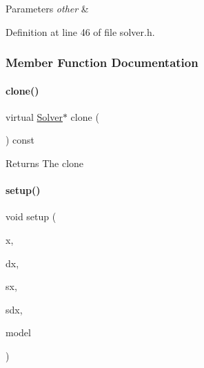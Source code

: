 \begin{DoxyParams}{Parameters}
{\em other} & \\
\hline
\end{DoxyParams}


Definition at line 46 of file solver.\+h.



\subsubsection{Member Function Documentation}
\mbox{\label{classamici_1_1_solver_ad40c0e06f5ee35afc1dd60e9f80ac5be}} 
\paragraph{\texorpdfstring{clone()}{clone()}}
{\footnotesize\ttfamily virtual \mbox{\hyperlink{classamici_1_1_solver}{Solver}}$\ast$ clone (\begin{DoxyParamCaption}{ }\end{DoxyParamCaption}) const\hspace{0.3cm}{\ttfamily [pure virtual]}}

\begin{DoxyReturn}{Returns}
The clone 
\end{DoxyReturn}
\mbox{\label{classamici_1_1_solver_a5cffde567803181ec12c71117c74b47a}} 
\paragraph{\texorpdfstring{setup()}{setup()}}
{\footnotesize\ttfamily void setup (\begin{DoxyParamCaption}\item[{\mbox{\hyperlink{classamici_1_1_ami_vector}{Ami\+Vector}} $\ast$}]{x,  }\item[{\mbox{\hyperlink{classamici_1_1_ami_vector}{Ami\+Vector}} $\ast$}]{dx,  }\item[{\mbox{\hyperlink{classamici_1_1_ami_vector_array}{Ami\+Vector\+Array}} $\ast$}]{sx,  }\item[{\mbox{\hyperlink{classamici_1_1_ami_vector_array}{Ami\+Vector\+Array}} $\ast$}]{sdx,  }\item[{\mbox{\hyperlink{classamici_1_1_model}{Model}} $\ast$}]{model }\end{DoxyParamCaption})}


